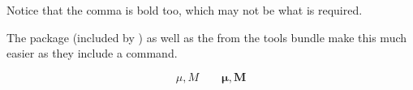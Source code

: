 \noindent
Notice that the comma is bold too, which may not be what is required.

The package  (included by ) as well as the
 from the tools bundle make this much easier as they include
a  command.
\ifx\boldsymbol\undefined\else
\begin{example}
\begin{displaymath}
\mu, M \qquad
\boldsymbol{\mu}, \boldsymbol{M}
\end{displaymath}
\end{example}
\fi




